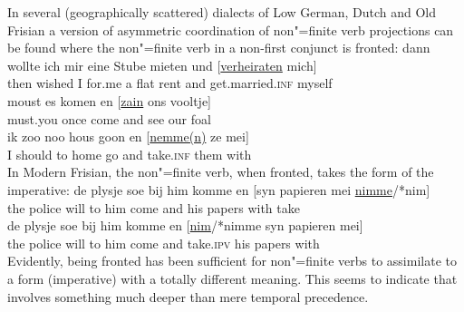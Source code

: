 \documentclass[output=paper]{LSP/langsci}
\begin{document}
\randnum\label{rn:15-37}In several (geographically scattered) dialects
of Low German, Dutch and Old Frisian a version of asymmetric
coordination of non"=finite verb projections can be found where the
non"=finite verb in a non-first conjunct is fronted:
\eal%
\settowidth{}
\label{ex:15-17}
\ex%
\label{ex:15-17a}
\gll
dann wollte ich mir eine Stube mieten und [\underline{verheiraten} mich] \\ 
then wished I for.me a flat rent and \spacebr{}get.married.\textsc{inf} myself \\ 
\ex%
\label{ex:15-17b}
\gll
moust es komen en [\underline{zain} ons vooltje] \\
must.you once come and \spacebr{}see our foal \\
\ex%
\label{ex:15-17c}
\gll
ik zoo noo hous goon en [\underline{nemme(n)} ze mei] \\
I should to home go and \spacebr{}take.\textsc{inf} them with \\
\zl
\addlines
\randnum\label{rn:15-38}In Modern Frisian, the non"=finite verb, when fronted, takes the form of the imperative:
\eal%
\settowidth{}
\label{ex:15-18}
\ex%
\label{ex:15-18a}
\gll
de plysje soe bij him komme en [syn papieren mei \underline{nimme}/*nim] \\
the police will to him come and \spacebr{}his papers with take \\
\ex%
\label{ex:15-18b}
\gll
de plysje soe bij him komme en [\underline{nim}/*nimme syn papieren mei] \\
the police will to him come and \spacebr{}take.\textsc{ipv} his papers with \\
\zl
\randnum\label{rn:15-39}Evidently, being fronted has been sufficient
for non"=finite verbs to assimilate to a form (imperative) with a
totally different meaning. This seems to indicate that  involves something much deeper than mere temporal precedence.


\nocite{Hudson1977,Taraldsen1986,Sarauw1924}

\sloppy
\printbibliography[heading=subbibliography,notkeyword=this]
\label{chap-creatures-end}
\end{document}
